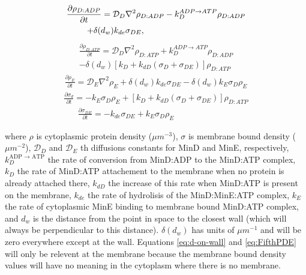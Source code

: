 \documentclass[letterpaper,twocolumn,amsmath,amssymb,pre]{revtex4-1}
\begin{document}
\begin{multline}
  \frac{\partial \rho_{D:ADP}}{\partial t} = \mathcal{D}_D\nabla^2\rho_{D:ADP}-k_D^{ADP\rightarrow ATP}\rho_{D:ADP}\\
  +\delta(d_w)k_{de}\sigma_{DE},\hspace{3.4cm}
\end{multline}
\begin{multline}
  \frac{\partial \rho_{D:ATP}}{\partial t} = \mathcal{D}_D\nabla^2\rho_{D:ATP}+k_D^{ADP\rightarrow ATP}\rho_{D:ADP}\\
  -\delta(d_w)[k_D+k_{dD}(\sigma_D+\sigma_{DE})]\rho_{D:ATP}
\end{multline}
\begin{multline}
  \frac{\partial \rho_E}{\partial t} = \mathcal{D}_E\nabla^2\rho_E+\delta(d_w)k_{de}\sigma_{DE}
  -\delta(d_w)k_E \sigma_D \rho_E
\end{multline}
\begin{multline}
  \frac{\partial \sigma_d}{\partial t} = -k_E\sigma_D\rho_E
  +[k_D+k_{dD}(\sigma_D+\sigma_{DE})]\rho_{D:ATP}
  \label{eq:d-on-wall}
\end{multline}
\begin{multline}
  \frac{\partial \sigma_{DE}}{\partial t} = -k_{de}\sigma_{DE}+k_E\sigma_D\rho_E\hspace{3cm}
  \label{eq:FifthPDE}
\end{multline}

where $\rho$ is cytoplasmic protein density ($\mu m^{-3}$), $\sigma$
is membrane bound density ($\mu m^{-2}$), $\mathcal{D}_D$ and
$\mathcal{D}_{E}$ th diffusions constants for MinD and MinE,
respectively, $k_D^{\textrm{ADP $\rightarrow$ ATP}}$ the rate of
conversion from MinD:ADP to the MinD:ATP complex, $k_D$ the rate of
MinD:ATP attachement to the membrane when no protein is already
attached there, $k_{dD}$ the increase of this rate when MinD:ATP is
present on the membrane, $k_{de}$ the rate of hydrolisis of the
MinD:MinE:ATP complex, $k_E$ the rate of cytoplasmic MinE binding to
membrane bound MinD:ATP complex, and $d_w$ is the distance from the
point in space to the closest wall (which will always be
perpendicular to this distance).  $\delta(d_w)$ has units of
$\mu m^{-1}$ and will be zero everywhere except at the wall.
Equations \ref{eq:d-on-wall} and \ref{eq:FifthPDE} will only be
relevent at the membrane because the membrane bound density values
will have no meaning in the cytoplasm where there is no membrane.
\end{document}
